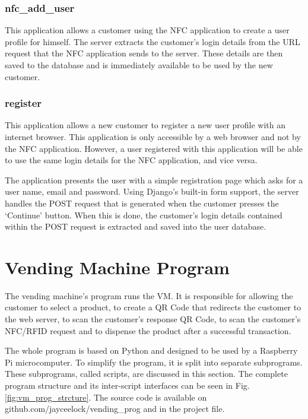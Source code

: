 \subsubsection{nfc\_add\_user}
\label{sec:nfc-add-user}

This application allows a customer using the NFC application to create a user profile for
himself. The server extracts the customer's login details from the URL request that the
NFC application sends to the server. These details are then saved to the database and is immediately available to be used by the new
customer. 

\subsubsection{register}

This application allows a new customer to register a new user profile with an internet
browser. This application is only accessible by a web browser and not by the NFC
application. However, a user registered with this application will be able to use the
same login details for the NFC application, and vice versa.

The application presents the user with a simple registration page which asks for a user
name, email and password. Using Django's built-in form support, the server handles the
POST request that is generated when the customer presses the `Continue' button. When this
is done, the customer's login details contained within the POST request is extracted and
saved into the user database.

\section{Vending Machine Program}

The vending machine's program runs the VM. It is responsible for
allowing the customer to select a product, to create a QR Code that redirects
the customer to the web server, to scan the customer's response QR Code, to
scan the customer's NFC/RFID request and to dispense the product after a successful
transaction.

The whole program is based on Python and designed to be used by a Raspberry Pi
microcomputer. To simplify the program, it is split into separate subprograms. These
subprograms, called scripts, are discussed in this section. The complete
program structure and its inter-script interfaces can be seen in Fig.
\ref{fig:vm_prog_strcture}. The source code is available on
github.com/jayceelock/vending\_prog and in the project file. 

